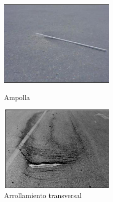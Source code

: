 \begin{figure}[ht!]
\begin{minipage}{0.3\linewidth}
		\centering
		\includegraphics[width=\linewidth]{figs/amp.png}
		\caption*{\centering Ampolla}
	\end{minipage}
	\hspace{0.5 cm}
	\begin{minipage}{0.3\linewidth}
		\centering
		\includegraphics[width=\linewidth]{figs/art.png}
		\caption*{\centering Arrollamiento transversal }
	\end{minipage}
	\hspace{0.5 cm}
	\begin{minipage}{0.3\linewidth}
		\centering

\end{minipage}
\end{figure}
